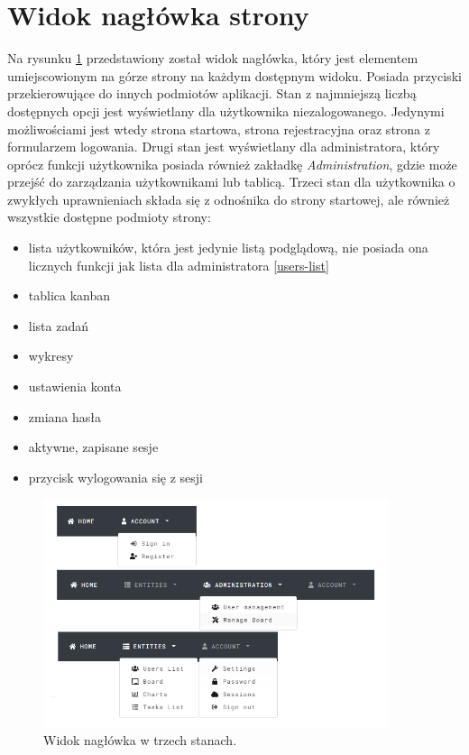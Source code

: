\section{Widok nagłówka strony}
Na rysunku \ref{navbar-states} przedstawiony został widok nagłówka, który jest elementem umiejscowionym na górze strony na każdym dostępnym widoku. Posiada przyciski przekierowujące do innych podmiotów aplikacji.
Stan z najmniejszą liczbą dostępnych opcji jest wyświetlany dla użytkownika niezalogowanego. Jedynymi możliwościami jest wtedy strona startowa, strona rejestracyjna oraz strona z formularzem logowania.
Drugi stan jest wyświetlany dla administratora, który oprócz funkcji użytkownika posiada również zakładkę \linebreak \textit{Administration}, gdzie może przejść do zarządzania użytkownikami lub tablicą.
Trzeci stan dla użytkownika o zwykłych uprawnieniach składa się z odnośnika do strony startowej, ale również wszystkie dostępne podmioty strony: 
\begin{itemize}
	\item lista użytkowników, która jest jedynie listą podglądową, nie posiada ona licznych funkcji jak lista dla administratora \ref{users-list}
	\item tablica kanban
	\item lista zadań
	\item wykresy
	\item ustawienia konta
	\item zmiana hasła
	\item aktywne, zapisane sesje
	\item przycisk wylogowania się z sesji
\end{itemize}
\begin{figure}[h!]
	\centering
	\includegraphics[width=0.90\textwidth]{navbar-states}
	
	\caption{Widok nagłówka w trzech stanach.}
	\label{navbar-states}
\end{figure}
\clearpage

